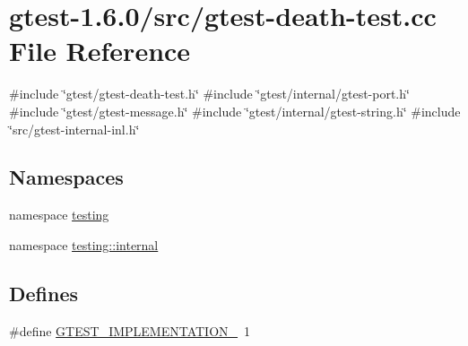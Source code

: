 \hypertarget{gtest-death-test_8cc}{\section{gtest-\/1.6.0/src/gtest-\/death-\/test.cc \-File \-Reference}
\label{de/d50/gtest-death-test_8cc}
}
{\ttfamily \#include \char`\"{}gtest/gtest-\/death-\/test.\-h\char`\"{}}\*
{\ttfamily \#include \char`\"{}gtest/internal/gtest-\/port.\-h\char`\"{}}\*
{\ttfamily \#include \char`\"{}gtest/gtest-\/message.\-h\char`\"{}}\*
{\ttfamily \#include \char`\"{}gtest/internal/gtest-\/string.\-h\char`\"{}}\*
{\ttfamily \#include \char`\"{}src/gtest-\/internal-\/inl.\-h\char`\"{}}\*
\subsection*{\-Namespaces}
\begin{DoxyCompactItemize}
\item 
namespace \hyperlink{namespacetesting}{testing}
\item 
namespace \hyperlink{namespacetesting_1_1internal}{testing\-::internal}
\end{DoxyCompactItemize}
\subsection*{\-Defines}
\begin{DoxyCompactItemize}
\item 
\#define \hyperlink{gtest-death-test_8cc_a83bd232fd1077579fada92c31bb7469f}{\-G\-T\-E\-S\-T\-\_\-\-I\-M\-P\-L\-E\-M\-E\-N\-T\-A\-T\-I\-O\-N\-\_\-}~1
\end{DoxyCompactItemize}
